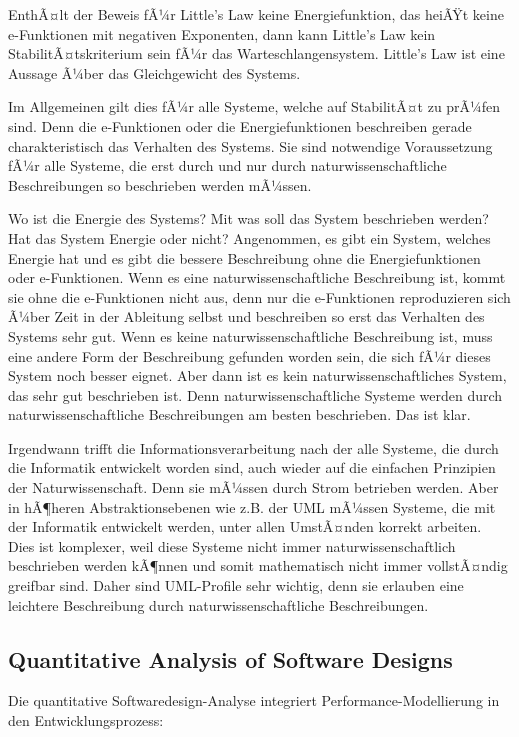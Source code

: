 ﻿\documentclass[a4paper,12pt]{scrreprt}
\theoremstyle{definition}
\begin{document}
EnthÃ¤lt der Beweis fÃ¼r Little's Law keine Energiefunktion, das heiÃŸt keine e-Funktionen mit negativen Exponenten, dann kann Little's Law kein StabilitÃ¤tskriterium sein fÃ¼r das Warteschlangensystem. Little's Law ist eine Aussage Ã¼ber das Gleichgewicht des Systems.

Im Allgemeinen gilt dies fÃ¼r alle Systeme, welche auf StabilitÃ¤t zu prÃ¼fen sind. Denn die e-Funktionen oder die Energiefunktionen beschreiben gerade charakteristisch das Verhalten des Systems. Sie sind notwendige Voraussetzung fÃ¼r alle Systeme, die erst durch und nur durch naturwissenschaftliche Beschreibungen so beschrieben werden mÃ¼ssen.

Wo ist die Energie des Systems? Mit was soll das System beschrieben werden? Hat das System Energie oder nicht? Angenommen, es gibt ein System, welches Energie hat und es gibt die bessere Beschreibung ohne die Energiefunktionen oder e-Funktionen. Wenn es eine naturwissenschaftliche Beschreibung ist, kommt sie ohne die e-Funktionen nicht aus, denn nur die e-Funktionen reproduzieren sich Ã¼ber Zeit in der Ableitung selbst und beschreiben so erst das Verhalten des Systems sehr gut. Wenn es keine naturwissenschaftliche Beschreibung ist, muss eine andere Form der Beschreibung gefunden worden sein, die sich fÃ¼r dieses System noch besser eignet. Aber dann ist es kein naturwissenschaftliches System, das sehr gut beschrieben ist. Denn naturwissenschaftliche Systeme werden durch naturwissenschaftliche Beschreibungen am besten beschrieben. Das ist klar.

Irgendwann trifft die Informationsverarbeitung nach der alle Systeme, die durch die Informatik entwickelt worden sind, auch wieder auf die einfachen Prinzipien der Naturwissenschaft. Denn sie mÃ¼ssen durch Strom betrieben werden. Aber in hÃ¶heren Abstraktionsebenen wie z.B. der UML mÃ¼ssen Systeme, die mit der Informatik entwickelt werden, unter allen UmstÃ¤nden korrekt arbeiten. Dies ist komplexer, weil diese Systeme nicht immer naturwissenschaftlich beschrieben werden kÃ¶nnen und somit mathematisch nicht immer vollstÃ¤ndig greifbar sind. Daher sind UML-Profile sehr wichtig, denn sie erlauben eine leichtere Beschreibung durch naturwissenschaftliche Beschreibungen.

\subsection{Quantitative Analysis of Software Designs}

Die quantitative Softwaredesign-Analyse \cite{smith1990} integriert Performance-Modellierung in den Entwicklungsprozess:
\end{document}
